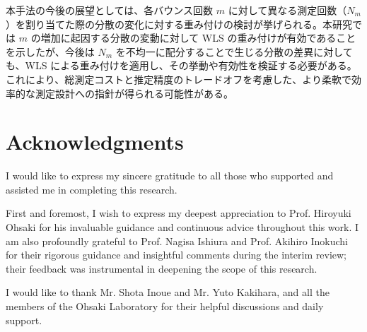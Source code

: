 \documentclass[12pt,a4paper,titlepage,dvipdfmx]{article}
\begin{document}
本手法の今後の展望としては、各バウンス回数 $m$ に対して異なる測定回数（$N_m$）を割り当てた際の分散の変化に対する重み付けの検討が挙げられる。本研究では $m$ の増加に起因する分散の変動に対して WLS の重み付けが有効であることを示したが、今後は $N_m$ を不均一に配分することで生じる分散の差異に対しても、WLS による重み付けを適用し、その挙動や有効性を検証する必要がある。これにより、総測定コストと推定精度のトレードオフを考慮した、より柔軟で効率的な測定設計への指針が得られる可能性がある。



\newpage

\appendix

\section*{Acknowledgments}


I would like to express my sincere gratitude to all those who supported and assisted me in completing this research.

First and foremost, I wish to express my deepest appreciation to Prof. Hiroyuki Ohsaki for his invaluable guidance and continuous advice throughout this work. I am also profoundly grateful to Prof. Nagisa Ishiura and Prof. Akihiro Inokuchi for their rigorous guidance and insightful comments during the interim review; their feedback was instrumental in deepening the scope of this research.

I would like to thank Mr. Shota Inoue and Mr. Yuto Kakihara, and all the members of the Ohsaki Laboratory for their helpful discussions and daily support.



\newpage

\renewcommand{\em}{\it}


\end{document}
